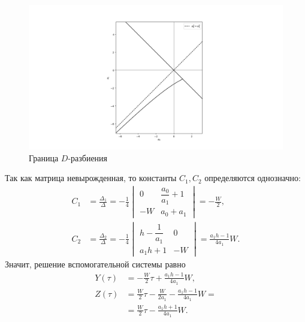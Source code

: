 \documentclass[a4paper,14pt]{article}
\theoremstyle{definition}
\begin{document}
\begin{figure}
  \centering
  \includegraphics[width=\textwidth]{first-case}
  \caption{Граница $D$-разбиения}\label{fig:first-case}
\end{figure}

Так как матрица невырожденная, то константы $C_1, C_2$
определяются однозначно:
\begin{equation*}
  \begin{aligned}
    C_1
    &=
      \frac{\Delta_1}{\Delta}
      =
      -\frac{1}{4}
      \begin{vmatrix}
        0 & \dfrac{a_0}{a_1} + 1 \\
        -W & a_0 + a_1
      \end{vmatrix}
      =
      - \frac{W}{2}, \\
    C_2
    &=
      \frac{\Delta_2}{\Delta}
      =
      - \frac{1}{4}
      \begin{vmatrix}
        h - \dfrac{1}{a_1} & 0 \\
        a_1 h + 1 & -W
      \end{vmatrix}
      =
      \frac{a_1 h - 1}{4 a_1} W.
  \end{aligned}
\end{equation*}
Значит, решение вспомогательной системы равно
\begin{equation*}
  \begin{aligned}
    Y(\tau)
    &=
      -\frac{W}{2} \tau + \frac{a_1 h - 1}{4 a_1} W, \\
    Z(\tau)
    &=
      \frac{W}{2} \tau
      - \frac{W}{2 a_1}
      - \frac{a_1 h - 1}{4 a_1} W = \\
    &=
      \frac{W}{2} \tau
      - \frac{a_1 h + 1}{4 a_1} W.
  \end{aligned}
\end{equation*}
\end{document}
